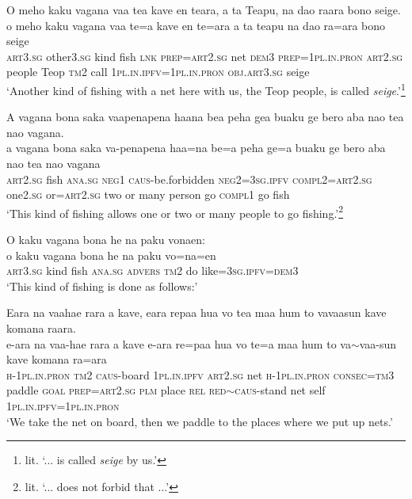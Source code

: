 \ea\label{ex:text24-1}
O meho kaku vagana vaa tea kave en teara, a ta Teapu, na dao raara bono seige.\\
\gll o	meho	kaku	vagana	vaa	te=a	kave	en	te=ara	a	ta	teapu	na	dao	ra=ara	bono	seige\\
     \textsc{art}3.\textsc{sg}	other3.\textsc{sg}	kind	fish	\textsc{lnk}	\textsc{prep}=\textsc{art}2.\textsc{sg}	net	\textsc{dem}3	\textsc{prep}=1\textsc{pl}.\textsc{in}.\textsc{pron}	\textsc{art}2.\textsc{sg}	people	Teop	\textsc{tm}2	call	1\textsc{pl}.\textsc{in}.\textsc{ipfv}=1\textsc{pl}.\textsc{in}.\textsc{pron}	\textsc{obj}.\textsc{art}3.\textsc{sg}	seige\\
\glt `Another kind of fishing with a net here with us, the Teop people, is called \textit{seige}.'\footnote{lit. `... is called \textit{seige} by us.'}
\z

\ea\label{ex:text24-2}
A vagana bona saka vaapenapena haana bea peha gea buaku ge bero aba nao tea nao vagana.\\
\gll a	vagana	bona	saka	va-penapena	haa=na	be=a	peha	ge=a	buaku	ge	bero	aba	nao	tea	nao	vagana\\
     \textsc{art}2.\textsc{sg}	fish	\textsc{ana}.\textsc{sg}	\textsc{neg}1	\textsc{caus}-be.forbidden	\textsc{neg}2=3\textsc{sg}.\textsc{ipfv}	\textsc{compl}2=\textsc{art}2.\textsc{sg}	one2.\textsc{sg}	or=\textsc{art}2.\textsc{sg}	two	or	many	person	go	\textsc{compl}1	go	fish\\
\glt `This kind of fishing allows one or two or many people to go fishing.'\footnote{lit. `... does not forbid that ...'}
\z

\ea\label{ex:text24-3}
O kaku vagana bona he na paku vonaen:\\
\gll o	kaku	vagana	bona	he	na	paku	vo=na=en\\
     \textsc{art}3.\textsc{sg}	kind	fish	\textsc{ana}.\textsc{sg}	\textsc{advers}	\textsc{tm}2	do	like=3\textsc{sg}.\textsc{ipfv}=\textsc{dem}3\\
\glt `This kind of fishing is done as follows:'
\z

\ea\label{ex:text24-4}
Eara na vaahae rara a kave, eara repaa hua vo tea maa hum to vavaasun kave komana raara.\\
\gll e-ara	na	vaa-hae	rara	a	kave	e-ara	re=paa	hua	vo	te=a	maa	hum	to	va{$\sim$}vaa-sun	kave	komana	ra=ara\\
     \textsc{h}-1\textsc{pl}.\textsc{in}.\textsc{pron}	\textsc{tm}2	\textsc{caus}-board	1\textsc{pl}.\textsc{in}.\textsc{ipfv}	\textsc{art}2.\textsc{sg}	net	\textsc{h}-1\textsc{pl}.\textsc{in}.\textsc{pron}	\textsc{consec}=\textsc{tm}3	paddle	\textsc{goal}	\textsc{prep}=\textsc{art}2.\textsc{sg}	\textsc{plm}	place	\textsc{rel}	\textsc{red}{$\sim$}\textsc{caus}-stand	net	self	1\textsc{pl}.\textsc{in}.\textsc{ipfv}=1\textsc{pl}.\textsc{in}.\textsc{pron}\\
\glt `We take the net on board, then we paddle to the places where we put up nets.'
\z

